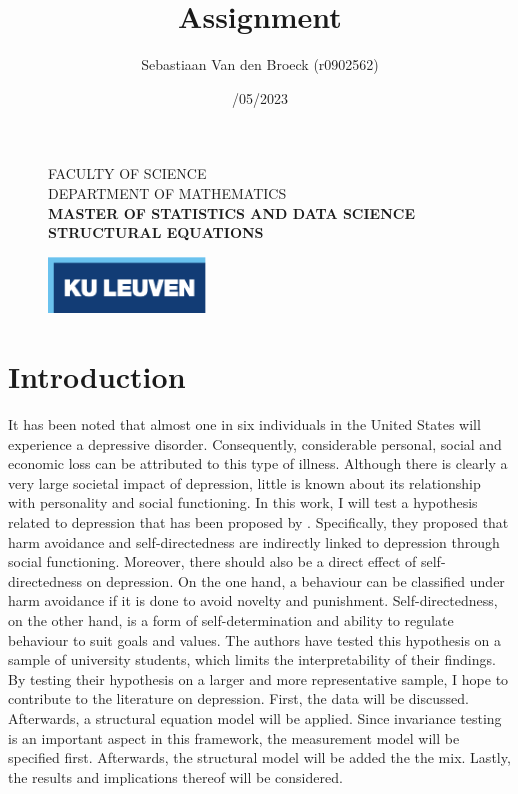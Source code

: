 \documentclass[11pt]{article}
\title{\vspace*{40.0mm}
  \bf\sf Assignment
         \vspace*{20.0mm} \\
  \vspace*{40.0mm}}
\author{\sf Sebastiaan Van den Broeck (r0902562)}
\date{\sf 28/05/2023}
\begin{document}
\begin{figure}
  \parbox[t]{125mm}{
    \vspace*{6mm}
    \scriptsize\sf           FACULTY OF SCIENCE \\
    \scriptsize\sf           DEPARTMENT OF MATHEMATICS \\
    \scriptsize\sf\bfseries  MASTER OF STATISTICS AND DATA SCIENCE \\
    \scriptsize\sf\bfseries  STRUCTURAL EQUATIONS \\}
  \parbox[t]{40mm}{
    \begin{flushright}
      \includegraphics[height=15mm]{logo.eps.pdf}
    \end{flushright}}
\end{figure}

\maketitle
\thispagestyle{empty}
\raggedbottom

\pagebreak
\tableofcontents

\cleardoublepage
\setcounter{page}{1}
\setcounter{tocdepth}{3}


\pagebreak\section{Introduction}

It has been noted that almost one in six individuals in the United States will
experience a depressive disorder. Consequently, considerable personal, social
and economic loss can be attributed to this type of illness. Although there is
clearly a very large societal impact of depression, little is known about its
relationship with personality and social functioning. In this work, I will test
a hypothesis related to depression that has been proposed by \textcite{tse2011}.
Specifically, they proposed that harm avoidance and self-directedness are
indirectly linked to depression through social functioning. Moreover, there
should also be a direct effect of self-directedness on depression. On the one
hand, a behaviour can be classified under harm avoidance if it is done to avoid
novelty and punishment. Self-directedness, on the other hand, is a form of
self-determination and ability to regulate behaviour to suit goals and values.
The authors have tested this hypothesis on a sample of university students,
which limits the interpretability of their findings. By testing their hypothesis
on a larger and more representative sample, I hope to contribute to the
literature on depression. First, the data will be discussed. Afterwards, a
structural equation model will be applied. Since invariance testing is an
important aspect in this framework, the measurement model will be specified
first. Afterwards, the structural model will be added the the mix. Lastly, the
results and implications thereof will be considered.
\end{document}
